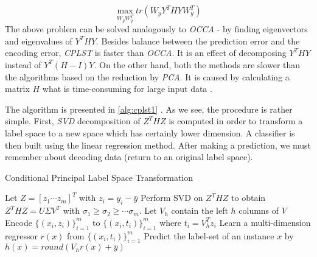 \begin{equation}\label{eq:cplst6}
    \max_{W_yW_y^T} tr(W_yY^THYW_y^T)  
\end{equation}
The above problem can be solved analogously to \textit{OCCA} - by finding eigenvectors and eigenvalues of $Y^THY$. Besides balance between the prediction error and the encoding error, \textit{CPLST} is faster than \textit{OCCA}. It is an effect of decomposing $Y^THY$ instead of $Y^T(H-I)Y$. On the other hand, both the methods are slower than the algorithms based on the reduction by \textit{PCA}. It is caused by calculating a matrix $H$ what is time-consuming for large input data \cite{ChenLin}.

The algorithm is presented in \cref{alg:cplst1} \cite{ChenLin}. As we see, the procedure is rather simple. First, \textit{SVD} decomposition of $Z^THZ$  is computed in order to transform a label space to a new space which has certainly lower dimension. A classifier is then built using the linear regression method. After making a prediction, we must remember about decoding data (return to an original label space).  

\begin{algorithm}
    \caption{Conditional Principal Label Space Transformation}\label{alg:cplst1}
    \begin{algorithmic}[1]
        \State Let $Z=[z_1 \cdots z_m]^T$ with $z_i=y_i-\bar{y}$
        \State Perform SVD on $Z^THZ$ to obtain $Z^THZ=U\Sigma V^T$ with $\sigma_{1} \geq \sigma_{2} \geq \cdots \sigma_{m}$. Let $V_h$ contain the left $h$ columns of $V$
        \State Encode $\{(x_i,z_i)\}^{m}_{i=1}$ to $\{(x_i,t_i)\}^{m}_{i=1}$ where $t_i=V^T_hz_i$
        \State Learn a multi-dimension regressor $r(x)$ from $\{(x_i,t_i)\}^{m}_{i=1}$ 
        \State Predict the label-set of an instance $x$ by $h(x)=round(V_hr(x)+\bar{y})$  
    \end{algorithmic}
\end{algorithm}


